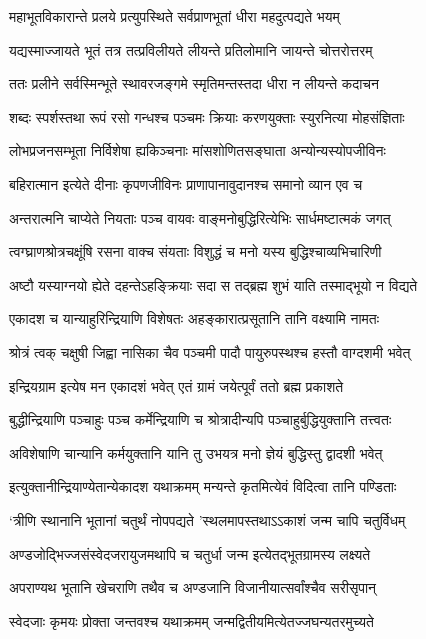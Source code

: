 \twolineshloka
{महाभूतविकारान्ते प्रलये प्रत्युपस्थिते}
{सर्वप्राणभूतां धीरा महदुत्पद्यते भयम्}


\twolineshloka
{यद्यस्माज्जायते भूतं तत्र तत्प्रविलीयते}
{लीयन्ते प्रतिलोमानि जायन्ते चोत्तरोत्तरम्}


\twolineshloka
{ततः प्रलीने सर्वस्मिन्भूते स्थावरजङ्गमे}
{स्मृतिमन्तस्तदा धीरा न लीयन्ते कदाचन}


\twolineshloka
{शब्दः स्पर्शस्तथा रूपं रसो गन्धश्च पञ्चमः}
{क्रियाः करणयुक्ताः स्युरनित्या मोहसंज्ञिताः}


\twolineshloka
{लोभप्रजनसम्भूता निर्विशेषा ह्यकिञ्चनाः}
{मांसशोणितसङ्घाता अन्योन्यस्योपजीविनः}


\twolineshloka
{बहिरात्मान इत्येते दीनाः कृपणजीविनः}
{प्राणापानावुदानश्च समानो व्यान एव च}


\twolineshloka
{अन्तरात्मनि चाप्येते नियताः पञ्च वायवः}
{वाङ्मनोबुद्धिरित्येभिः सार्धमष्टात्मकं जगत्}


\twolineshloka
{त्वग्घ्राणश्रोत्रचक्षूंषि रसना वाक्च संयताः}
{विशुद्धं च मनो यस्य बुद्धिश्चाव्यभिचारिणी}


\twolineshloka
{अष्टौ यस्याग्नयो ह्येते दहन्तेऽहङ्क्रियाः सदा}
{स तद्ब्रह्म शुभं याति तस्माद्भूयो न विद्यते}


\twolineshloka
{एकादश च यान्याहुरिन्द्रियाणि विशेषतः}
{अहङ्कारात्प्रसूतानि तानि वक्ष्यामि नामतः}


\twolineshloka
{श्रोत्रं त्वक् चक्षुषी जिह्वा नासिका चैव पञ्चमी}
{पादौ पायुरुपस्थश्च हस्तौ वाग्दशमी भवेत्}


\twolineshloka
{इन्द्रियग्राम इत्येष मन एकादशं भवेत्}
{एतं ग्रामं जयेत्पूर्वं ततो ब्रह्म प्रकाशते}


\twolineshloka
{बुद्धीन्द्रियाणि पञ्चाहुः पञ्च कर्मेन्द्रियाणि च}
{श्रोत्रादीन्यपि पञ्चाहुर्बुद्धियुक्तानि तत्त्वतः}


\twolineshloka
{अविशेषाणि चान्यानि कर्मयुक्तानि यानि तु}
{उभयत्र मनो ज्ञेयं बुद्धिस्तु द्वादशी भवेत्}


\twolineshloka
{इत्युक्तानीन्द्रियाण्येतान्येकादश यथाक्रमम्}
{मन्यन्ते कृतमित्येवं विदित्वा तानि पण्डिताः}


\twolineshloka
{`त्रीणि स्थानानि भूतानां चतुर्थं नोपपद्यते}
{'स्थलमापस्तथाऽऽकाशं जन्म चापि चतुर्विधम्}


\twolineshloka
{अण्डजोद्भिज्जसंस्वेदजरायुजमथापि च}
{चतुर्धा जन्म इत्येतद्भूतग्रामस्य लक्ष्यते}


\twolineshloka
{अपराण्यथ भूतानि खेचराणि तथैव च}
{अण्डजानि विजानीयात्सर्वांश्चैव सरीसृपान्}


\twolineshloka
{स्वेदजाः कृमयः प्रोक्ता जन्तवश्च यथाक्रमम्}
{जन्मद्वितीयमित्येतज्जघन्यतरमुच्यते}



